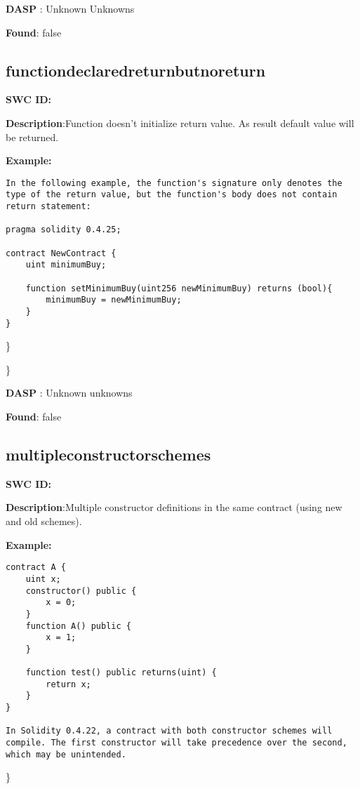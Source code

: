 \documentclass{article}
\begin{document}
\textbf{DASP} : Unknown Unknowns

\textbf{Found}: false

\subsection{function\textunderscore declared\textunderscore return\textunderscore but\textunderscore no\textunderscore return} 
\textbf{SWC \textunderscore ID:} 

\textbf{Description}:Function doesn't initialize return value. As result default value will be returned.


\textbf{Example:} 
\begin{verbatim}
In the following example, the function's signature only denotes the type of the return value, but the function's body does not contain return statement:

pragma solidity 0.4.25;

contract NewContract {
    uint minimumBuy;

    function setMinimumBuy(uint256 newMinimumBuy) returns (bool){
        minimumBuy = newMinimumBuy;
    }
}

\end{verbatim}\} 

\} 

\textbf{DASP} : Unknown unknowns

\textbf{Found}: false

\subsection{multiple\textunderscore constructor\textunderscore schemes} 
\textbf{SWC \textunderscore ID:} 

\textbf{Description}:Multiple constructor definitions in the same contract (using new and old schemes).


\textbf{Example:} 
\begin{verbatim}
contract A {
    uint x;
    constructor() public {
        x = 0;
    }
    function A() public {
        x = 1;
    }

    function test() public returns(uint) {
        return x;
    }
}

In Solidity 0.4.22, a contract with both constructor schemes will compile. The first constructor will take precedence over the second, which may be unintended.

\end{verbatim}\} 
\end{document}
